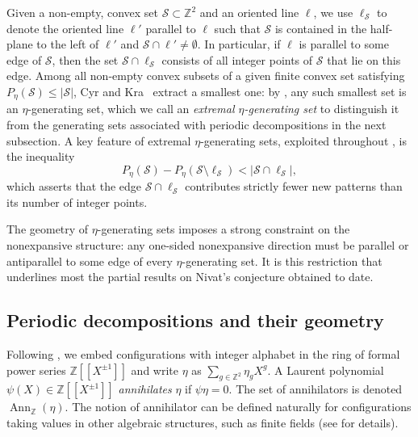 \documentclass[12pt]{amsart}
\numberwithin{equation}{section}
\DeclareMathOperator{\Ann}{Ann}
\newcommand{\bb}[1]{\mathbb{#1}}
\newcommand{\llb}{[\![}
\newcommand{\rrb}{]\!]}
\begin{document}
Given a non-empty, convex set $ \mathcal S \subset \mathbb Z^2 $ and an oriented line $\pmb{\ell}$, we use $\pmb{\ell}_{\mathcal{S}}$ to denote the oriented line $\pmb{\ell}'$ parallel to $\pmb{\ell}$ such that $\mathcal{S}$ is contained in the half-plane to the left of $\pmb{\ell}'$ and $\mathcal{S} \cap \pmb{\ell}' \neq \emptyset$. In particular, if $\pmb{\ell}$ is parallel to some edge of $\mathcal{S}$, then the set $ \mathcal S \cap \pmb{\ell}_{\mathcal S} $ consists of all integer points of $ \mathcal S $ that lie on this edge. Among all non-empty convex subsets of a given finite convex set satisfying $ P_\eta(\mathcal S) \le |\mathcal S| $, Cyr and Kra~\cite{CyrKra15} extract a smallest one: by \cite[Lemma~2.5]{CyrKra15}, any such smallest set is an $\eta$-generating set, which we call an \emph{extremal $\eta$-generating set} to distinguish it from the generating sets associated with periodic decompositions in the next subsection. 
A key feature of extremal $\eta$-generating sets, exploited throughout \cite[Section~4]{CyrKra15}, is the inequality
\begin{equation}\label{eq:balanced}
P_\eta(\mathcal S) - P_\eta(\mathcal S \setminus \pmb{\ell}_{\mathcal S}) < |\mathcal S \cap \pmb{\ell}_{\mathcal S}|,
\end{equation}
which asserts that the edge $ \mathcal S \cap \pmb{\ell}_{\mathcal S} $ contributes strictly fewer new patterns than its number of integer points.

The geometry of $\eta$-generating sets imposes a strong constraint on the nonexpansive structure: any one-sided nonexpansive direction must be parallel or antiparallel to some edge of every $\eta$-generating set. It is this restriction that underlines most the partial results on Nivat's conjecture obtained to date.

\subsection{Periodic decompositions and their geometry}\label{subsec:decomp}

Following \cite{KariSzabados20}, we embed configurations with integer
alphabet in the ring of formal power series $\mathbb Z\llb X^{\pm1}\rrb$ and
write $\eta$ as $\sum_{g\in\mathbb Z^2}\eta_g X^g$.  A Laurent polynomial
$\psi(X)\in \mathbb Z\llb X^{\pm1}\rrb$ \emph{annihilates} $\eta$ if $\psi\eta=0$.
The set of annihilators is denoted $\Ann_{\bb{Z}}(\eta)$. The notion of annihilator can be defined naturally for configurations taking values in other algebraic structures, such as finite fields (see \cite{Colle22} for details).
\end{document}
